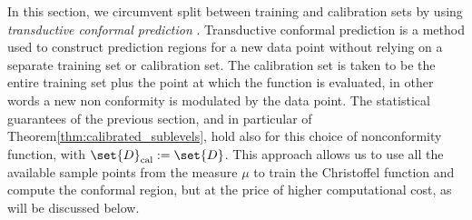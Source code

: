 \documentclass[pmlr]{jmlr}%
\begin{document}
In this section, we circumvent split between training and calibration sets by using \emph{trans\-duc\-tive conformal prediction} \cite{vovk2013transductive}. Transductive conformal prediction is a method used to construct prediction regions for a new data point without relying on a separate training set or calibration set. The calibration set is taken to be the entire training set plus the point at which the function is evaluated, in other words a new non conformity is modulated by the data point. 
%
The statistical guarantees of the previous section, and in particular of Theorem\;\ref{thm:calibrated_sublevels}, hold also for this choice of nonconformity function, with $\set{D}_\mathrm{cal} := \set{D}$.
This approach allows us to use all the available sample points from the measure $\mu$ to train the Christoffel function and compute the conformal region, but at the price of higher computational cost, as will be discussed below.
%
\end{document}
